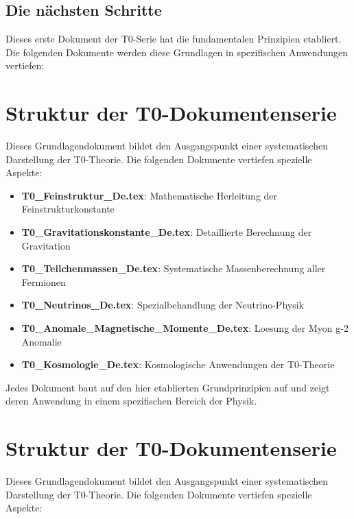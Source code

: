 \documentclass[12pt,a4paper]{article}
\begin{document}
		
	\subsection{Die nächsten Schritte}
	
	Dieses erste Dokument der T0-Serie hat die fundamentalen Prinzipien etabliert. Die folgenden Dokumente werden diese Grundlagen in spezifischen Anwendungen vertiefen:
	
	\section{Struktur der T0-Dokumentenserie}

Dieses Grundlagendokument bildet den Ausgangspunkt einer systematischen Darstellung der T0-Theorie. Die folgenden Dokumente vertiefen spezielle Aspekte:

\begin{itemize}
	\item \textbf{T0\_Feinstruktur\_De.tex}: Mathematische Herleitung der Feinstrukturkonstante
	\item \textbf{T0\_Gravitationskonstante\_De.tex}: Detaillierte Berechnung der Gravitation
	\item \textbf{T0\_Teilchenmassen\_De.tex}: Systematische Massenberechnung aller Fermionen
	\item \textbf{T0\_Neutrinos\_De.tex}: Spezialbehandlung der Neutrino-Physik
	\item \textbf{T0\_Anomale\_Magnetische\_Momente\_De.tex}: Loesung der Myon g-2 Anomalie
	\item \textbf{T0\_Kosmologie\_De.tex}: Kosmologische Anwendungen der T0-Theorie
\end{itemize}

Jedes Dokument baut auf den hier etablierten Grundprinzipien auf und zeigt deren Anwendung in einem spezifischen Bereich der Physik.
\section{Struktur der T0-Dokumentenserie}

Dieses Grundlagendokument bildet den Ausgangspunkt einer systematischen Darstellung der T0-Theorie. Die folgenden Dokumente vertiefen spezielle Aspekte:
\end{document}
